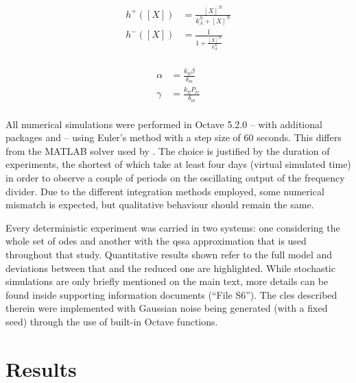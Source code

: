   \begin{multicols}{2}
    \begin{equation*}
      \begin{aligned}
        h^+([X]) &= \frac{[X]^N}{k_A^N + [X]^N} \\
        h^-([X]) &= \frac{1}{1 + \frac{[X]^N}{k_A^N}} \\
      \end{aligned}
    \end{equation*}

    \columnbreak

    \begin{equation*}
      \begin{aligned}
        \alpha &= \frac{k_{tl} \beta}{\delta_m} \\
        \gamma &= \frac{k_{tl} P_{tc}}{\delta_m} \\
      \end{aligned}
    \end{equation*}
  \end{multicols}

  All numerical simulations were performed in Octave 5.2.0 -- with additional packages  and  -- using Euler's method with a step size of $60$ seconds.
  This differs from the MATLAB  solver used by \citet{multif}.
  The choice is justified by the duration of experiments, the shortest of which take at least four days (virtual simulated time) in order to observe a couple of periods on the oscillating output of the frequency divider.
  Due to the different integration methods employed, some numerical mismatch is expected, but qualitative behaviour should remain the same.

  Every deterministic experiment was carried in two systems: one considering the whole set of \ac{ode}s and another with the \ac{qssa} approximation that is used throughout that study.
  Quantitative results shown refer to the full model and deviations between that and the reduced one are highlighted.
  While stochastic simulations are only briefly mentioned on the main text, more details can be found inside supporting information documents (``File S6'').
  The \ac{cles} described therein were implemented with Gaussian noise being generated (with a fixed seed) through the use of built-in Octave functions.


\section{Results}


